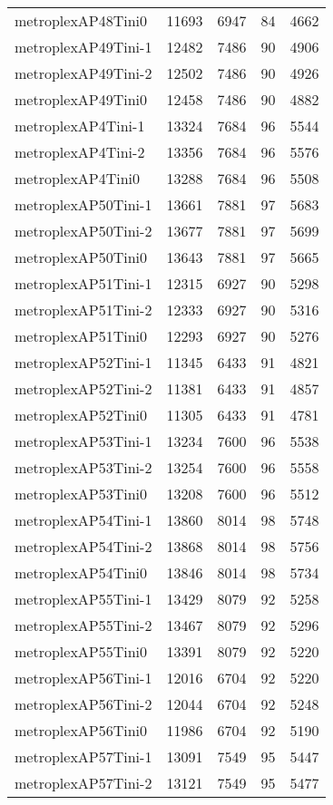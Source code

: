 \begin{longtable}{lrrrr}
metroplexAP48Tini0 & 11693 & 6947 & 84 & 4662 \\
metroplexAP49Tini-1 & 12482 & 7486 & 90 & 4906 \\
metroplexAP49Tini-2 & 12502 & 7486 & 90 & 4926 \\
metroplexAP49Tini0 & 12458 & 7486 & 90 & 4882 \\
metroplexAP4Tini-1 & 13324 & 7684 & 96 & 5544 \\
metroplexAP4Tini-2 & 13356 & 7684 & 96 & 5576 \\
metroplexAP4Tini0 & 13288 & 7684 & 96 & 5508 \\
metroplexAP50Tini-1 & 13661 & 7881 & 97 & 5683 \\
metroplexAP50Tini-2 & 13677 & 7881 & 97 & 5699 \\
metroplexAP50Tini0 & 13643 & 7881 & 97 & 5665 \\
metroplexAP51Tini-1 & 12315 & 6927 & 90 & 5298 \\
metroplexAP51Tini-2 & 12333 & 6927 & 90 & 5316 \\
metroplexAP51Tini0 & 12293 & 6927 & 90 & 5276 \\
metroplexAP52Tini-1 & 11345 & 6433 & 91 & 4821 \\
metroplexAP52Tini-2 & 11381 & 6433 & 91 & 4857 \\
metroplexAP52Tini0 & 11305 & 6433 & 91 & 4781 \\
metroplexAP53Tini-1 & 13234 & 7600 & 96 & 5538 \\
metroplexAP53Tini-2 & 13254 & 7600 & 96 & 5558 \\
metroplexAP53Tini0 & 13208 & 7600 & 96 & 5512 \\
metroplexAP54Tini-1 & 13860 & 8014 & 98 & 5748 \\
metroplexAP54Tini-2 & 13868 & 8014 & 98 & 5756 \\
metroplexAP54Tini0 & 13846 & 8014 & 98 & 5734 \\
metroplexAP55Tini-1 & 13429 & 8079 & 92 & 5258 \\
metroplexAP55Tini-2 & 13467 & 8079 & 92 & 5296 \\
metroplexAP55Tini0 & 13391 & 8079 & 92 & 5220 \\
metroplexAP56Tini-1 & 12016 & 6704 & 92 & 5220 \\
metroplexAP56Tini-2 & 12044 & 6704 & 92 & 5248 \\
metroplexAP56Tini0 & 11986 & 6704 & 92 & 5190 \\
metroplexAP57Tini-1 & 13091 & 7549 & 95 & 5447 \\
metroplexAP57Tini-2 & 13121 & 7549 & 95 & 5477 \\

\end{longtable}
